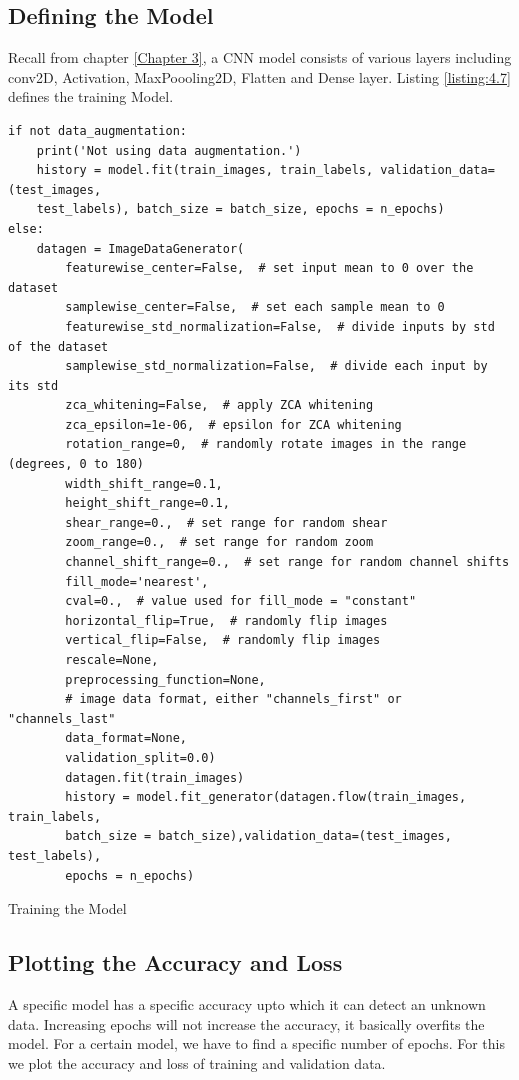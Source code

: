 \subsection{Defining the Model}
Recall from chapter \ref{Chapter 3}, a CNN model consists of various layers including
conv2D, Activation, MaxPoooling2D, Flatten and Dense layer. Listing \ref{listing:4.7}
defines the training Model.

\begin{listing}[H]
    \begin{verbatim}
if not data_augmentation:
    print('Not using data augmentation.')
    history = model.fit(train_images, train_labels, validation_data=(test_images,
    test_labels), batch_size = batch_size, epochs = n_epochs)
else:
    datagen = ImageDataGenerator(
        featurewise_center=False,  # set input mean to 0 over the dataset
        samplewise_center=False,  # set each sample mean to 0
        featurewise_std_normalization=False,  # divide inputs by std of the dataset
        samplewise_std_normalization=False,  # divide each input by its std
        zca_whitening=False,  # apply ZCA whitening
        zca_epsilon=1e-06,  # epsilon for ZCA whitening
        rotation_range=0,  # randomly rotate images in the range (degrees, 0 to 180)
        width_shift_range=0.1,
        height_shift_range=0.1,
        shear_range=0.,  # set range for random shear
        zoom_range=0.,  # set range for random zoom
        channel_shift_range=0.,  # set range for random channel shifts
        fill_mode='nearest',
        cval=0.,  # value used for fill_mode = "constant"
        horizontal_flip=True,  # randomly flip images
        vertical_flip=False,  # randomly flip images
        rescale=None,
        preprocessing_function=None,
        # image data format, either "channels_first" or "channels_last"
        data_format=None,
        validation_split=0.0)
        datagen.fit(train_images)
        history = model.fit_generator(datagen.flow(train_images, train_labels,
        batch_size = batch_size),validation_data=(test_images, test_labels),
        epochs = n_epochs)  
    \end{verbatim}
    \caption{Training the Model}
\label{listing:4.7}
\end{listing}
\subsection{Plotting the Accuracy and Loss}
A specific model has a specific accuracy upto which it can detect an unknown data.
Increasing epochs will not increase the accuracy, it basically overfits
the model. For a certain model, we have to find a specific number
of epochs. For this we plot the accuracy and loss of training and
validation data.

